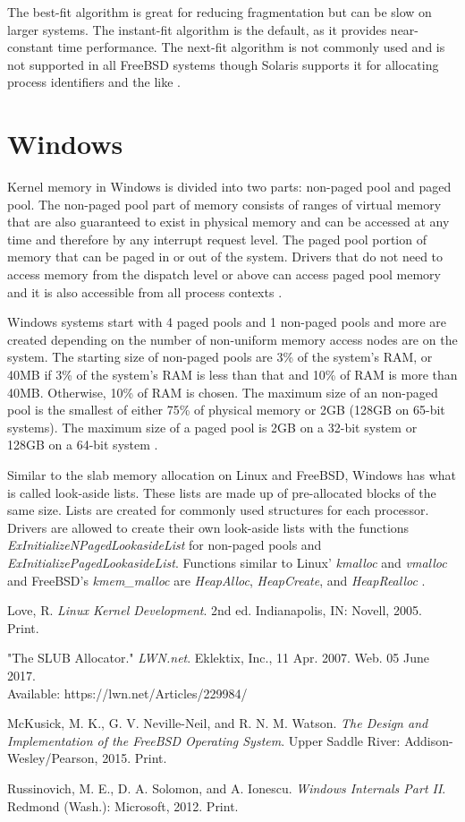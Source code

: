 \documentclass[10pt,draftclsnofoot,onecolumn,journal,compsoc]{IEEEtran}
\begin{document}
The best-fit algorithm is great for reducing fragmentation but can be slow on larger systems. The instant-fit algorithm is the default, as it provides near-constant time performance. The next-fit algorithm is not commonly used and is not supported in all FreeBSD systems though Solaris supports it for allocating process identifiers and the like \cite{bsd}. 

\section{Windows}
Kernel memory in Windows is divided into two parts: non-paged pool and paged pool. The non-paged pool part of memory consists of ranges of virtual memory that are also guaranteed to exist in physical memory and can be accessed at any time and therefore by any interrupt request level. The paged pool portion of memory that can be paged in or out of the system. Drivers that do not need to access memory from the dispatch level or above can access paged pool memory and it is also accessible from all process contexts \cite{win}. 

Windows systems start with 4 paged pools and 1 non-paged pools and more are created depending on the number of non-uniform memory access nodes are on the system. The starting size of non-paged pools are 3\% of the system's RAM, or 40MB if 3\% of the system's RAM is less than that and 10\% of RAM is more than 40MB. Otherwise, 10\% of RAM is chosen. The maximum size of an non-paged pool is the smallest of either 75\% of physical memory or 2GB (128GB on 65-bit systems). The maximum size of a paged pool is 2GB on a 32-bit system or 128GB on a 64-bit system \cite{win}. 

Similar to the slab memory allocation on Linux and FreeBSD, Windows has what is called look-aside lists. These lists are made up of pre-allocated blocks of the same size. Lists are created for commonly used structures for each processor. Drivers are allowed to create their own look-aside lists with the functions \textit{ExInitializeNPagedLookasideList} for non-paged pools and \textit{ExInitializePagedLookasideList}. Functions similar to Linux' \textit{kmalloc} and \textit{vmalloc} and FreeBSD's  \textit{kmem\_malloc} are \textit{HeapAlloc}, \textit{HeapCreate}, and \textit{HeapRealloc} \cite{win}. 

\newpage

\begin{thebibliography}{}

Love, R. \textit{Linux Kernel Development}. 2nd ed. Indianapolis, IN: Novell, 2005. Print.

"The SLUB Allocator." \textit{LWN.net}. Eklektix, Inc., 11 Apr. 2007. Web. 05 June 2017. \\
Available: https://lwn.net/Articles/229984/

McKusick, M. K., G. V. Neville-Neil, and R. N. M. Watson. \textit{The Design and Implementation of the FreeBSD Operating System}. Upper Saddle River: Addison-Wesley/Pearson, 2015. Print.

Russinovich, M. E., D. A. Solomon, and A. Ionescu. \textit{Windows Internals Part II}. Redmond (Wash.): Microsoft, 2012. Print.
\end{thebibliography}
\end{document}
